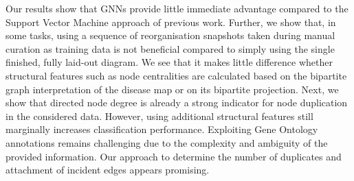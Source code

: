 \documentclass[
	fontsize=10pt, %
	twoside=false, %
	secnumdepth=1, %
  toc=indentunnumbered %
]{kaobook}
\begin{document}
Our results show that GNNs provide little immediate advantage compared to the
Support Vector Machine approach of previous work. 
%
Further, we show that, in some tasks, using a sequence of reorganisation
snapshots taken during manual curation as training data is not beneficial
compared to simply using the single finished, fully laid-out diagram.
%
We see that it makes little difference whether structural features such as node
centralities are calculated based on the bipartite graph interpretation of the
disease map or on its bipartite projection.
%
Next, we show that directed node degree is already a strong indicator for
node duplication in the considered data. However, using additional structural
features still marginally increases classification performance.
%
Exploiting Gene Ontology annotations remains challenging due to the complexity
and ambiguity of the provided information.
%
Our approach to determine the number of duplicates and attachment of incident
edges appears promising.





\end{document}
